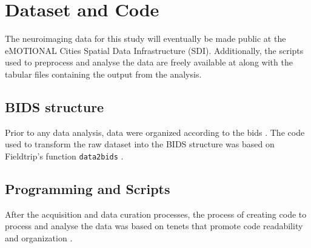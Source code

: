 
\chapter{Dataset and Code}
\label{chapter:appendixVectors}

The neuroimaging data for this study will eventually be made public at the eMOTIONAL Cities Spatial Data Infrastructure (SDI). Additionally, the scripts used to preprocess and analyse the data are freely available at \href{https://github.com/JoaoAmaro2001/masters_thesis}{\color{blue}{this github repository}} along with the tabular files containing the output from the analysis.

\section{BIDS structure}
Prior to any data analysis, data were organized according to the \acrfull{bids} \cite{gorgolewskiBrainImagingData2016, pernetEEGBIDSExtensionBrain2019}. The code used to transform the raw dataset into the BIDS structure was based on Fieldtrip's function \texttt{data2bids} \cite{oostenveldFieldTripOpenSource2011}.

\section{Programming and Scripts}
After the acquisition and data curation processes, the process of creating code to process and analyse the data was based on tenets that promote code readability and organization \cite{vlietSevenQuickTips2020}.

